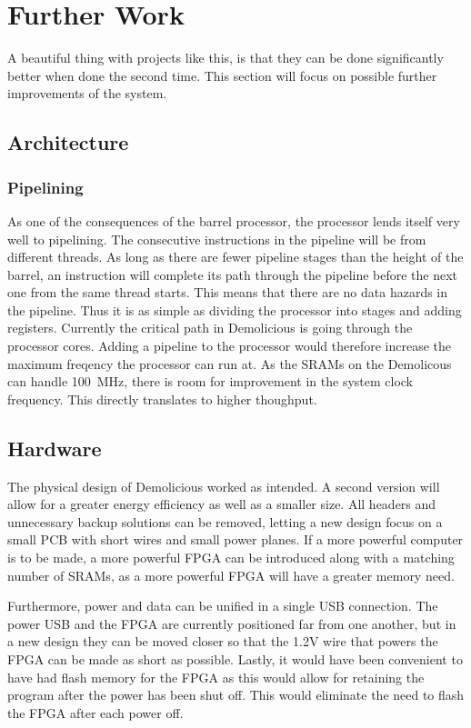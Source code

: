 \documentclass[../main/report.tex]{subfiles}
\begin{document}
\section{Further Work}

A beautiful thing with projects like this, is that they can be done significantly better when done the second time.
This section will focus on possible further improvements of the system.

\subsection{Architecture}
\subsubsection*{Pipelining}
As one of the consequences of the barrel processor, the processor lends itself very well to pipelining.
The consecutive instructions in the pipeline will be from different threads.
As long as there are fewer pipeline stages than the height of the barrel, an instruction will complete its path through the pipeline before the next one from the same thread starts.
This means that there are no data hazards in the pipeline. Thus it is as simple as dividing the processor into stages and adding registers.
Currently the critical path in Demolicious is going through the processor cores.
Adding a pipeline to the processor would therefore increase the maximum freqency the processor can run at.
As the SRAMs on the Demolicous can handle \SI{100}{MHz}, there is room for improvement in the system clock frequency.
This directly translates to higher thoughput.

\subsection{Hardware}
The physical design of Demolicious worked as intended.
A second version will allow for a greater energy efficiency as well as a smaller size.
All headers and unnecessary backup solutions can be removed, letting a new design focus on a small PCB with short wires and small power planes.
If a more powerful computer is to be made, a more powerful FPGA can be introduced along with a matching number of SRAMs, as a more powerful FPGA will have a greater memory need.

Furthermore, power and data can be unified in a single USB connection.
The power USB and the FPGA are currently positioned far from one another, but in a new design they can be moved closer so that the 1.2V wire that powers the FPGA can be made as short as possible.
Lastly, it would have been convenient to have had flash memory for the FPGA as this would allow for retaining the program after the power has been shut off.
This would eliminate the need to flash the FPGA after each power off.
\end{document}
